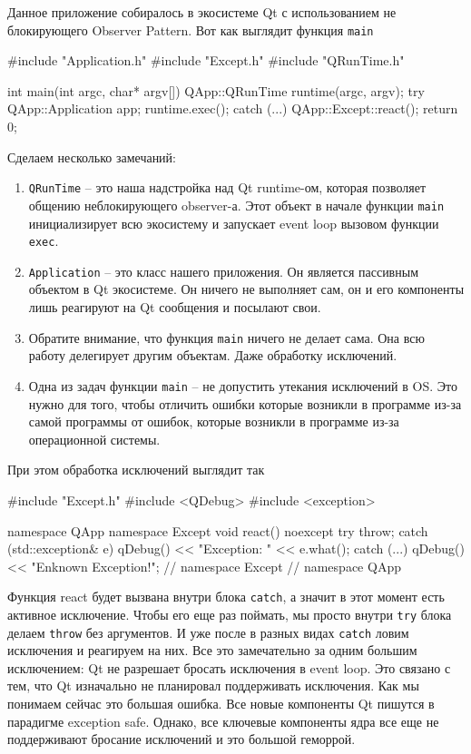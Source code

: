 Данное приложение собиралось в экосистеме Qt с использованием не блокирующего Observer Pattern.
Вот как выглядит функция \verb"main"
\begin{cppcode}
#include "Application.h"
#include "Except.h"
#include "QRunTime.h"

int main(int argc, char* argv[]) {
  QApp::QRunTime runtime(argc, argv);
  try {
    QApp::Application app;
    runtime.exec();
  } catch (...) {
    QApp::Except::react();
  }
  return 0;
}
\end{cppcode}
Сделаем несколько замечаний:
\begin{enumerate}
\item \verb"QRunTime" -- это наша надстройка над Qt runtime-ом, которая позволяет общению неблокирующего observer-а.
Этот объект в начале функции \verb"main" инициализирует всю экосистему и запускает event loop вызовом функции \verb"exec".

\item \verb"Application" -- это класс нашего приложения.
Он является пассивным объектом в Qt экосистеме.
Он ничего не выполняет сам, он и его компоненты лишь реагируют на Qt сообщения и посылают свои.

\item Обратите внимание, что функция \verb"main" ничего не делает сама.
Она всю работу делегирует другим объектам.
Даже обработку исключений.

\item Одна из задач функции \verb"main" -- не допустить утекания исключений в OS.
Это нужно для того, чтобы отличить ошибки которые возникли в программе из-за самой программы от ошибок, которые возникли в программе из-за операционной системы.
\end{enumerate}
При этом обработка исключений выглядит так
\begin{cppcode}
#include "Except.h"
#include <QDebug>
#include <exception>

namespace QApp {
namespace Except {
void react() noexcept {
  try {
    throw;
  } catch (std::exception& e) {
    qDebug() << "Exception: " << e.what();
  } catch (...) {
    qDebug() << "Enknown Exception!";
  }
}
} // namespace Except
} // namespace QApp
\end{cppcode}
Функция react будет вызвана внутри блока \verb"catch", а значит в этот момент есть активное исключение.
Чтобы его еще раз поймать, мы просто внутри \verb"try" блока делаем \verb"throw" без аргументов.
И уже после в разных видах \verb"catch" ловим исключения и реагируем на них.
Все это замечательно за одним большим исключением: Qt не разрешает бросать исключения в event loop.
Это связано с тем, что Qt изначально не планировал поддерживать исключения.
Как мы понимаем сейчас это большая ошибка.
Все новые компоненты Qt пишутся в парадигме exception safe.
Однако, все ключевые компоненты ядра все еще не поддерживают бросание исключений и это большой геморрой.


